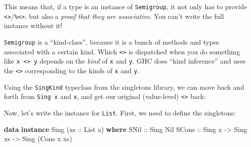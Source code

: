 \documentclass[]{article}
\newenvironment{Shaded}{}{}
\newcommand{\DataTypeTok}[1]{\textcolor[rgb]{0.56,0.13,0.00}{#1}}
\newcommand{\KeywordTok}[1]{\textcolor[rgb]{0.00,0.44,0.13}{\textbf{#1}}}
\newcommand{\NormalTok}[1]{#1}
\newcommand{\OperatorTok}[1]{\textcolor[rgb]{0.40,0.40,0.40}{#1}}
\newcommand{\OtherTok}[1]{\textcolor[rgb]{0.00,0.44,0.13}{#1}}
\begin{document}
This means that, if a type is an instance of \texttt{Semigroup}, it not only has
to provide
\texttt{\textless{}\textgreater{}}/\texttt{\%\textless{}\textgreater{}}, but
also a \emph{proof that they are associative}. You can't write the full instance
without it!

\texttt{Semigroup} is a ``kind-class'', because it is a bunch of methods and
types associated with a certain kind. Which \texttt{\textless{}\textgreater{}}
is dispatched when you do something like
\texttt{x\ \textless{}\textgreater{}\ y} depends on the \emph{kind} of
\texttt{x} and \texttt{y}. GHC does ``kind inference'' and uses the
\texttt{\textless{}\textgreater{}} corresponding to the kinds of \texttt{x} and
\texttt{y}.

Using the \texttt{SingKind} typeclass from the singletons library, we can move
back and forth from \texttt{Sing\ x} and \texttt{x}, and get our original
(value-level) \texttt{\textless{}\textgreater{}} back:

\begin{Shaded}
\end{Shaded}

Now, let's write the instance for \texttt{List}. First, we need to define the
singletons:

\begin{Shaded}
\begin{Highlighting}[]
\KeywordTok{data} \KeywordTok{instance} \DataTypeTok{Sing}\NormalTok{ (}\OtherTok{xs ::} \DataTypeTok{List}\NormalTok{ a) }\KeywordTok{where}
    \DataTypeTok{SNil}\OtherTok{  ::} \DataTypeTok{Sing} \DataTypeTok{Nil}
    \DataTypeTok{SCons}\OtherTok{ ::} \DataTypeTok{Sing}\NormalTok{ x }\OtherTok{{-}\textgreater{}} \DataTypeTok{Sing}\NormalTok{ xs }\OtherTok{{-}\textgreater{}} \DataTypeTok{Sing}\NormalTok{ (}\DataTypeTok{Cons}\NormalTok{ x xs)}
\end{Highlighting}
\end{Shaded}
\end{document}
